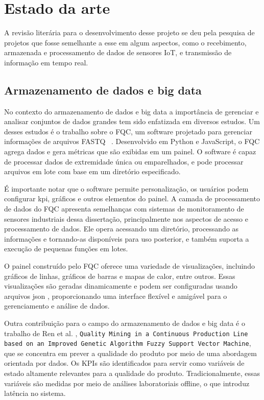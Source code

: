 \chapter{Estado da arte}\label{cap:conceptual}

A revisão literária para o desenvolvimento desse projeto se deu pela pesquisa de projetos que fosse semelhante a esse em algum aspectos, como o recebimento, armazenada e processamento de dados de sensores \gls{IoT}, e transmissão de informação em tempo real.

\section{Armazenamento de dados e big data}


No contexto do armazenamento de dados e big data a importância de gerenciar e analisar conjuntos de dados grandes tem sido enfatizada em diversos estudos. Um desses estudos é o trabalho sobre o \gls{FQC}, um software projetado para gerenciar informações de arquivos FASTQ ~\cite{fqc2017}. Desenvolvido em Python e JavaScript, o \gls{FQC} agrega dados e gera métricas que são exibidas em um painel. O software é capaz de processar dados de extremidade única ou emparelhados, e pode processar arquivos em lote com base em um diretório especificado.

É importante notar que o software permite personalização, os usuários podem configurar \gls{kpi}, gráficos e outros elementos do painel. A camada de processamento de dados do \gls{FQC} apresenta semelhanças com sistemas de monitoramento de sensores industriais dessa dissertação, principalmente nos aspectos de acesso e processamento de dados. Ele opera acessando um diretório, processando as informações e tornando-as disponíveis para uso posterior, e também suporta a execução de pequenas funções em lotes.


O painel construído pelo FQC oferece uma variedade de visualizações, incluindo gráficos de linhas, gráficos de barras e mapas de calor, entre outros. Essas visualizações são geradas dinamicamente e podem ser configuradas usando arquivos \gls{json} \cite{mdnJson}, proporcionando uma interface flexível e amigável para o gerenciamento e análise de dados.

Outra contribuição para o campo do armazenamento de dados e big data é o trabalho de Ren et al. \cite{ren2021data}, \texttt{Quality Mining in a Continuous Production Line based on an Improved Genetic Algorithm Fuzzy Support Vector Machine}, que se concentra em prever a qualidade do produto por meio de uma abordagem orientada por dados. Os \gls{KPIs} são identificados para servir como variáveis de estado altamente relevantes para a qualidade do produto. Tradicionalmente, essas variáveis são medidas por meio de análises laboratoriais offline, o que introduz latência no sistema.


